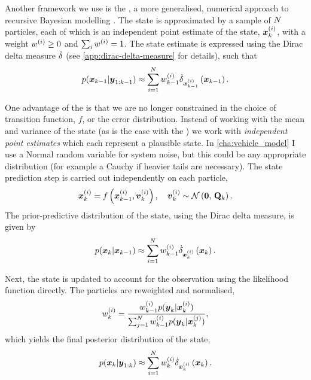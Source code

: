 Another framework we use is the \pf{}, a more generalised, numerical approach to recursive Bayesian modelling \citep{Gordon_1993}. The state is approximated by a sample of $N$ particles, each of which is an independent point estimate of the state, $\boldsymbol x^{(i)}_k$, with a weight $w^{(i)} \geq 0$ and $\sum_i w^{(i)} = 1$. The state estimate is expressed using the Dirac delta measure $\dot\delta$ (see \cref{app:dirac-delta-measure} for details), such that
\begin{equation}
\label{eq:pf_state}
p(\bx_{k-1} | \boldsymbol{y}_{1:k-1}) \approx
\sum_{i=1}^\Np w\vi_{k-1} \DiracMeasure{\bx\vi_{k-1}}{\bx_{k-1}}.
\end{equation}

One advantage of the \pf{} is that we are no longer constrained in the choice of transition function, $f$, or the error distribution. Instead of working with the mean and variance of the state (as is the case with the \kf{}) we work with \emph{independent point estimates} which each represent a plausible state. In \cref{cha:vehicle_model} I use a Normal random variable for system noise, but this could be any appropriate distribution (for example a Cauchy if heavier tails are necessary). The state prediction step is carried out independently on each particle,
\begin{equation}
\label{eq:ch2:pf_predict_particle}
\bx\vi_k = f\left(\bx\vi_{k-1}, \boldsymbol{v}\vi_k\right),
\quad
\boldsymbol{v}\vi_k \sim \Normal{\boldsymbol{0}}{\mat{Q}_k}.
\end{equation}
The prior-predictive distribution of the state, using the Dirac delta measure, is given by
\begin{equation}
\label{eq:ch2:pf_predict_state}
p(\bx_k | \bx_{k-1}) \approx
\sum_{i=1}^\Np w\vi_{k-1} \DiracMeasure{\bx\vi_k}{\bx_k}.
\end{equation}


Next, the state is updated to account for the observation using the likelihood function directly. The particles are reweighted and normalised,
\begin{equation}
\label{eq:pf_reweight}
w\vi_k =
\frac{
    w\vi_{k-1} p(\boldsymbol{y}_k | \bx\vi_k)
}{
    \sum_{j=1}^\Np w\vi_{k-1} p(\boldsymbol{y}_k | \bx\vi[j]_k)
},
\end{equation}
which yields the final posterior distribution of the state,
\begin{equation}
\label{eq:pf_state_post}
p(\bx_{k} | \boldsymbol{y}_{1:k}) \approx
\sum_{i=1}^\Np w\vi_{k} \DiracMeasure{\bx\vi_{k}}{\bx_{k}}.
\end{equation}


